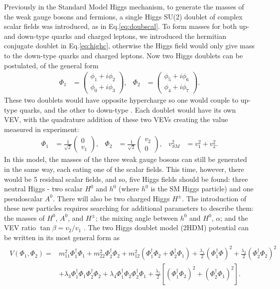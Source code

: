 \documentclass[a4paper,12pt]{article}
\begin{document}
Previously in the Standard Model Higgs mechanism, to generate the masses of the weak gauge bosons and fermions, a single Higgs SU(2) doublet of complex scalar fields was introduced, as in Eq.\eqref{eq:doubscal}.
To form masses for both up- and down-type quarks and charged leptons, we introduced the hermitian conjugate doublet in Eq.\eqref{eq:highc}, otherwise the Higgs field would only give mass to the down-type quarks and charged leptons. 
Now two Higgs doublets can be postulated, of the general form
\begin{align}
    \label{eq:gdbl}
    \Phi_1 &= \begin{pmatrix} \phi_1 + i\phi_2 \\ \phi_0 + i\phi_3\end{pmatrix}, & \Phi_2 &= \begin{pmatrix} \phi_5+i\phi_6\\\phi_4+i\phi_7\end{pmatrix}.
\end{align}
These two doublets would have opposite hypercharge so one would couple to up-type quarks, and the other to down-type \cite{branco}. 
Each doublet would have its own VEV, with the quadrature addition of these two VEVs creating the value measured in experiment:
\begin{align}
    \label{eq:dbldbl}
    \Phi_1 &= \frac{1}{\sqrt{2}}\begin{pmatrix}0\\v_1\end{pmatrix}, & \Phi_2 &= \frac{1}{\sqrt{2}}\begin{pmatrix}v_2\\0\end{pmatrix}, & v_{SM}^2 &= v_1^2 + v_2^2.
\end{align}
In this model, the masses of the three weak gauge bosons can still be generated in the same way, each eating one of the scalar fields. 
This time, however, there would be 5 residual scalar fields, and so, five Higgs fields should be found: three neutral Higgs - two scalar $H^0$ and $h^0$ (where $h^0$ is the SM Higgs particle) and one pseudoscalar $A^0$.
There will also be two charged Higgs $H^\pm$.
The introduction of these new particles requires searching for additional parameters to describe them: the masses of $H^0$, $A^0$, and $H^\pm$; the mixing angle between $h^0$ and $H^0$, $\alpha$; and the VEV ratio $\tan\beta=v_2/v_1$ \cite{hunter}.
The two Higgs doublet model (2HDM) potential can be written in its most general form as
\begin{align}
    \label{eq:HDMpot}
    \begin{split}
        V(\Phi_1,\Phi_2) =& m_{11}^2\Phi_1^\dagger\Phi_1 + m_{22}^2\Phi_2^\dagger\Phi_2 + m_{12}^2(\Phi_1^\dagger\Phi_2+\Phi_2^\dagger\Phi_1) + \frac{\lambda_1}{2}(\Phi_1^\dagger\Phi)^2 + \frac{\lambda_2}{2}(\Phi_2^\dagger\Phi_2)^2 \\
                                                        &+ \lambda_3\Phi_1^\dagger\Phi_1\Phi_2^\dagger\Phi_2 + \lambda_4\Phi_1^\dagger\Phi_2\Phi_2^\dagger\Phi_1 + \frac{\lambda_5}{2}\left[(\Phi_1^\dagger\Phi_2)^2+(\Phi_2^\dagger\Phi_1)^2\right].
    \end{split}
\end{align}
\end{document}
